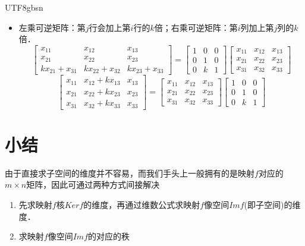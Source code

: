\documentclass[12pt]{article}
\begin{document}
\begin{CJK}{UTF8}{gbsn}
\begin{itemize}
\begin{equation}
\begin{array}{ccc}
\end{array}
\right]
\end{equation}
\item[\textbf{行/列缩放相加}] 左乘可逆矩阵：第$j$行会加上第$i$行的$k$倍；右乘可逆矩阵：第$i$列加上第$j$列的$k$倍．
\begin{equation}
\left[
\begin{array}{ccc}
x_{11} & x_{12} & x_{13}\\
x_{21} & x_{22} & x_{23}\\
kx_{21}+x_{31} & kx_{22}+x_{32} & kx_{23}+x_{33}
\end{array}
\right]
=
\left[
\begin{array}{ccc}
1 & 0 & 0\\
0 & 1 & 0\\
0 & k & 1
\end{array}
\right]
\left[
\begin{array}{ccc}
x_{11} & x_{12} & x_{13}\\
x_{21} & x_{22} & x_{23}\\
x_{31} & x_{32} & x_{33}
\end{array}
\right]
\end{equation}
\begin{equation}
\left[
\begin{array}{ccc}
x_{11} & x_{12}+kx_{13} & x_{13}\\
x_{21} & x_{22}+kx_{23} & x_{23}\\
x_{31} & x_{32}+kx_{33} & x_{33}
\end{array}
\right]
=
\left[
\begin{array}{ccc}
x_{11} & x_{12} & x_{13}\\
x_{21} & x_{22} & x_{23}\\
x_{31} & x_{32} & x_{33}
\end{array}
\right]
\left[
\begin{array}{ccc}
1 & 0 & 0\\
0 & 1 & 0\\
0 & k & 1
\end{array}
\right]
\end{equation}
\end{itemize}

\section{小结}
由于直接求子空间的维度并不容易，而我们手头上一般拥有的是映射$f$对应的$m \times n$矩阵，因此可通过两种方式间接解决
\begin{enumerate}
\item 先求映射$f$核$Kerf$的维度，再通过维数公式求映射$f$像空间$Imf$(即子空间)的维度．
\item 求映射$f$像空间$Imf$的对应的秩
\end{enumerate}

\end{CJK}
\end{document}
